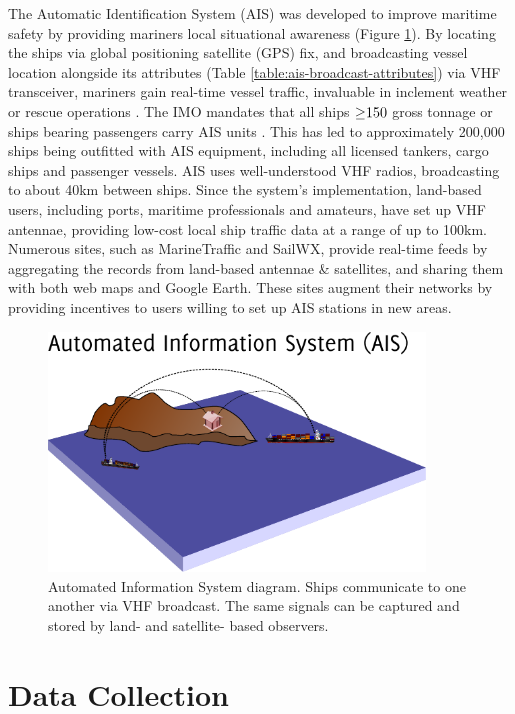 The Automatic Identification System (AIS) \citep{no20041028,Tetreault2002} was developed to improve maritime safety by providing mariners local situational awareness (Figure \ref{fig:ais-overview}). By locating the ships via global positioning satellite (GPS) fix, and broadcasting vessel location alongside its attributes (Table \ref{table:ais-broadcast-attributes}) via VHF transceiver, mariners gain real-time vessel traffic, invaluable in inclement weather or rescue operations \citep{Itu-r2010}.  The IMO mandates that all ships $\geq\negthickspace 150$ gross tonnage or ships bearing passengers carry AIS units \citep{solas}. This has led to approximately 200,000 ships being outfitted with AIS equipment, including all licensed tankers, cargo ships and passenger vessels. AIS uses well-understood VHF radios, broadcasting to about 40km between ships. Since the system's implementation, land-based users, including ports, maritime professionals and amateurs, have set up VHF antennae, providing low-cost local ship traffic data at a range of up to 100km. Numerous sites, such as MarineTraffic \citep{MarineTraffic} and SailWX, provide real-time feeds by aggregating the records from land-based antennae \& satellites, and sharing them with both web maps and Google Earth. These sites augment their networks by providing incentives to users willing to set up AIS stations in new areas.

\begin{figure}[htbp]
  \centering
  \includegraphics[width=100mm]{figures/towers/drawing.pdf}
  \caption[Automated Information System diagram]{Automated Information System diagram. Ships communicate to one another via VHF broadcast. The same signals can be captured and stored by land- and satellite- based observers.}
  \label{fig:ais-overview}
\end{figure}

\section{Data Collection}

